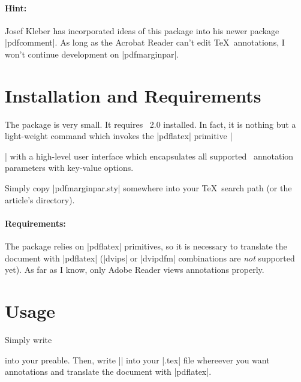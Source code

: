 \documentclass[a4paper]{ltxdoc}
\begin{document}
\paragraph{Hint:} Josef Kleber has incorporated ideas of this package into his newer package |pdfcomment|. As long as the Acrobat Reader can't edit \TeX\ annotations, I won't continue development on |pdfmarginpar|.

\section{Installation and Requirements}
The package is very small. It requires \pgfname\ 2.0 installed. In fact, it is nothing but a light-weight command which invokes the |pdflatex| primitive |\pdfannot| with a high-level user interface which encapsulates all supported \pdf\ annotation parameters with key-value options.

Simply copy |pdfmarginpar.sty| somewhere into your \TeX\ search path (or the article's directory).

\paragraph{Requirements:} The package relies on |pdflatex| primitives, so it is necessary to translate the document with |pdflatex| (|dvips| or |dvipdfm| combinations are \emph{not} supported yet). As far as I know, only Adobe Reader views annotations properly.

\section{Usage}
Simply write
\begin{codeexample}
\usepackage{pdfmarginpar}
\end{codeexample}
\noindent into your preable. Then, write |\pdfmarginpar| into your |.tex| file whereever you want annotations and translate the document with |pdflatex|.
\end{document}
